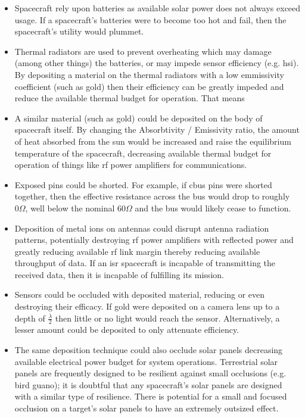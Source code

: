 \begin{itemize}

\item Spacecraft rely upon batteries as available solar power does not
  always exceed usage.  If a spacecraft's batteries were to become too
  hot and fail, then the spacecraft's utility would plummet.

\item Thermal radiators are used to prevent overheating which may
  damage (among other things) the batteries, or may impede sensor
  efficiency (e.g. \acf{hsi}).  By depositing a material on the
  thermal radiators with a low emmissivity coefficient (such as gold)
  then their efficiency can be greatly impeded and reduce the
  available thermal budget for operation.  That means 

\item A similar material (such as gold) could be deposited on the body
  of spacecraft itself.  By changing the Absorbtivity / Emissivity
  ratio, the amount of heat absorbed from the sun would be increased
  and raise the equilibrium temperature of the spacecraft, decreasing
  available thermal budget for operation of things like \ac{rf} power
  amplifiers for communications.

\item Exposed pins could be shorted.  For example, if \ac{cbus} pins
  were shorted together, then the effective resistance across the bus
  would drop to roughly $0\Omega$, well below the nominal $60\Omega$
  and the bus would likely cease to function.

\item Deposition of metal ions on antennas could disrupt antenna
  radiation patterns, potentially destroying \ac{rf} power amplifiers
  with reflected power and greatly reducing available \ac{rf} link
  margin thereby reducing available throughput of data.  If an
  \ac{isr} spacecraft is incapable of transmitting the received
  data, then it is incapable of fulfilling its mission.

\item Sensors could be occluded with deposited material, reducing or
  even destroying their efficacy.  If gold were deposited on a camera
  lens up to a depth of $\frac{\lambda}{2}$ then little or no light
  would reach the sensor.  Alternatively, a lesser amount could be
  deposited to only attenuate efficiency.
  
\item The same deposition technique could also occlude solar panels
  decreasing available electrical power budget for system operations.
  Terrestrial solar panels are frequently designed to be resilient
  against small occlusions (e.g. bird guano); it is doubtful that any
  spacecraft's solar panels are designed with a similar type of
  resilience.  There is potential for a small and focused occlusion on
  a target's solar panels to have an extremely outsized effect.


\end{itemize}
